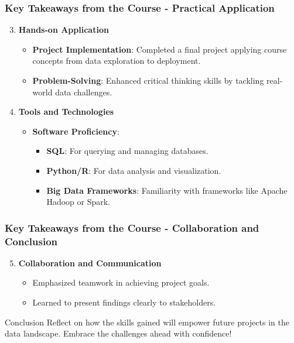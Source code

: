 \documentclass[aspectratio=169]{beamer}
\begin{document}
\begin{frame}[fragile]
    \frametitle{Key Takeaways from the Course - Practical Application}
    \begin{enumerate}
        \setcounter{enumi}{2}
        \item \textbf{Hands-on Application}
        \begin{itemize}
            \item \textbf{Project Implementation}: Completed a final project applying course concepts from data exploration to deployment.
            \item \textbf{Problem-Solving}: Enhanced critical thinking skills by tackling real-world data challenges.
        \end{itemize}
    
        \item \textbf{Tools and Technologies}
        \begin{itemize}
            \item \textbf{Software Proficiency}:
            \begin{itemize}
                \item \textbf{SQL}: For querying and managing databases.
                \item \textbf{Python/R}: For data analysis and visualization.
                \item \textbf{Big Data Frameworks}: Familiarity with frameworks like Apache Hadoop or Spark.
            \end{itemize}
        \end{itemize}
    \end{enumerate}
\end{frame}

\begin{frame}[fragile]
    \frametitle{Key Takeaways from the Course - Collaboration and Conclusion}
    \begin{enumerate}
        \setcounter{enumi}{4}
        \item \textbf{Collaboration and Communication}
        \begin{itemize}
            \item Emphasized teamwork in achieving project goals.
            \item Learned to present findings clearly to stakeholders.
        \end{itemize}
    \end{enumerate}

    \begin{block}{Conclusion}
        Reflect on how the skills gained will empower future projects in the data landscape. Embrace the challenges ahead with confidence!
    \end{block}
\end{frame}
\end{document}
